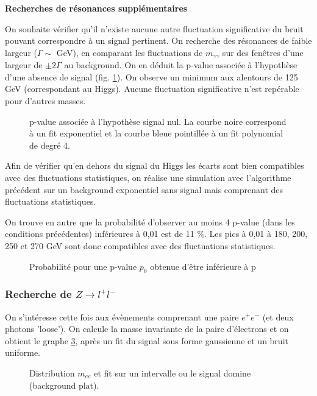 \documentclass[11pt]{article} %
\begin{document}
\textbf{Recherches de résonances supplémentaires}

On souhaite vérifier qu'il n'existe aucune autre fluctuation significative du bruit pouvant correspondre à un signal pertinent. On recherche des résonances de faible largeur ($\Gamma \sim$ GeV), en comparant les fluctuations de $m_{\gamma\gamma}$ sur des fenêtres d'une largeur de $\pm 2 \Gamma$ au background. On en déduit la p-value associée à l'hypothèse d'une absence de signal (fig. \ref{fig:pvalue}). On observe un minimum aux alentours de 125 GeV (correspondant au Higgs). Aucune fluctuation significative n'est repérable pour d'autres masses.

\begin{figure}[H]
\centering
  \caption{p-value associée à l'hypothèse signal nul. La courbe noire correspond à un fit exponentiel et la courbe bleue pointillée à un fit polynomial de degré 4. }
\label{fig:pvalue}
 \resizebox{.8\linewidth}{!}{}
\end{figure}

Afin de vérifier qu'en dehors du signal du Higgs les écarts sont bien compatibles avec des fluctuations statistiques, on réalise une simulation avec l'algorithme précédent sur un background exponentiel sans signal mais comprenant des fluctuations statistiques.

On trouve en autre que la probabilité d'observer au moins 4 p-value (dans les conditions précédentes) inférieures à 0,01 est de 11 \%. Les pics à 0,01 à 180, 200, 250 et 270 GeV sont donc compatibles avec des fluctuations statistiques.

\begin{figure}[H]
\centering
  \caption{Probabilité pour une p-value $p_0$ obtenue d'être inférieure à p  }
\label{fig:p0_threshold}
 \resizebox{.8\linewidth}{!}{}
\end{figure}

\subsubsection{Recherche de $Z\to l^+ l^-$}

On s'intéresse cette fois aux évènements comprenant une paire $e^+e^-$ (et deux photons 'loose'). On calcule la masse invariante de la paire d'électrons et on obtient le graphe \ref{fig:distribution_mee}, après un fit du signal sous forme gaussienne et un bruit uniforme. 

\begin{figure}[H]
\centering
  \caption{Distribution $m_{ee}$ et fit sur un intervalle ou le signal domine (background plat).  }
\label{fig:distribution_mee}
 \resizebox{.8\linewidth}{!}{}
\end{figure}
\end{document}
